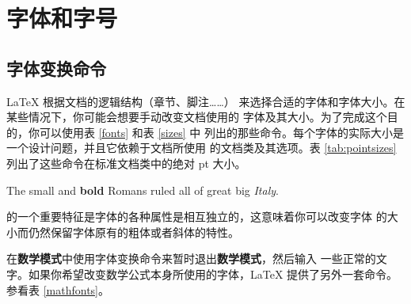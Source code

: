 \section{字体和字号}

\subsection{字体变换命令}
 \LaTeX{} 根据文档的逻辑结构（章节、脚注……）
来选择合适的字体和字体大小。在某些情况下，你可能会想要手动改变文档使用的
字体及其大小。为了完成这个目的，你可以使用表 \ref{fonts} 和表 \ref{sizes} 中
列出的那些命令。每个字体的实际大小是一个设计问题，并且它依赖于文档所使用
的文档类及其选项。表 \ref{tab:pointsizes} 列出了这些命令在标准文档类中的绝对 pt 大小。

\begin{example}
{\small The small and
\textbf{bold} Romans ruled}
{\Large all of great big
\textit{Italy}.}
\end{example}

\LaTeXe{} 的一个重要特征是字体的各种属性是相互独立的，这意味着你可以改变字体
的大小而仍然保留字体原有的粗体或者斜体的特性。

在\textbf{数学模式}中使用字体变换命令来暂时退出\textbf{数学模式}，然后输入
一些正常的文字。如果你希望改变数学公式本身所使用的字体，\LaTeX{} 提供了另外一套命令。
参看表 \ref{mathfonts}。

